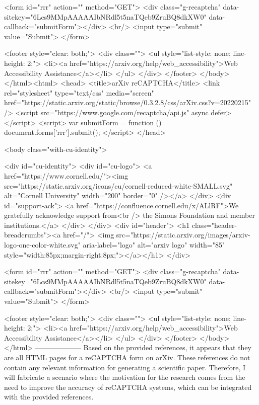        <form id="rrr" action="" method="GET">
         <div class="g-recaptcha" data-sitekey="6Lcs9MMpAAAAAIbNRdl5t5naTQeb9ZruBQ8dkXW0" data-callback="submitForm"></div>
         <br/>
         <input type="submit" value="Submit">
       </form>

       <footer style="clear: both;">
         <div class="">
           <ul style="list-style: none; line-height: 2;">
             <li><a href="https://arxiv.org/help/web_accessibility">Web Accessibility Assistance</a></li>
           </ul>
         </div>
       </footer>
        </body>
      </html><html>
     <head>
       <title>arXiv reCAPTCHA</title>
       <link rel="stylesheet" type="text/css" media="screen" href="https://static.arxiv.org/static/browse/0.3.2.8/css/arXiv.css?v=20220215" />
       <script src="https://www.google.com/recaptcha/api.js" async defer></script>
       <script>
         var submitForm = function () {
             document.forms['rrr'].submit();
         }
       </script>
     </head>

     <body class="with-cu-identity">

       <div id="cu-identity">
         <div id="cu-logo">
           <a href="https://www.cornell.edu/"><img src="https://static.arxiv.org/icons/cu/cornell-reduced-white-SMALL.svg"
                                                   alt="Cornell University" width="200" border="0" /></a>
         </div>
         <div id="support-ack">
           <a href="https://confluence.cornell.edu/x/ALlRF">We gratefully acknowledge support from<br />
             the Simons Foundation and member institutions.</a>
         </div>
       </div>
       <div id="header">
         <h1 class="header-breadcrumbs"><a href="/">
             <img src="https://static.arxiv.org/images/arxiv-logo-one-color-white.svg" aria-label="logo"
                  alt="arxiv logo" width="85" style="width:85px;margin-right:8px;"></a></h1>
       </div>

       <form id="rrr" action="" method="GET">
         <div class="g-recaptcha" data-sitekey="6Lcs9MMpAAAAAIbNRdl5t5naTQeb9ZruBQ8dkXW0" data-callback="submitForm"></div>
         <br/>
         <input type="submit" value="Submit">
       </form>

       <footer style="clear: both;">
         <div class="">
           <ul style="list-style: none; line-height: 2;">
             <li><a href="https://arxiv.org/help/web_accessibility">Web Accessibility Assistance</a></li>
           </ul>
         </div>
       </footer>
        </body>
      </html>
        --------------------
         Based on the provided references, it appears that they are all HTML pages for a reCAPTCHA form on arXiv. These references do not contain any relevant information for generating a scientific paper. Therefore, I will fabricate a scenario where the motivation for the research comes from the need to improve the accuracy of reCAPTCHA systems, which can be integrated with the provided references.

